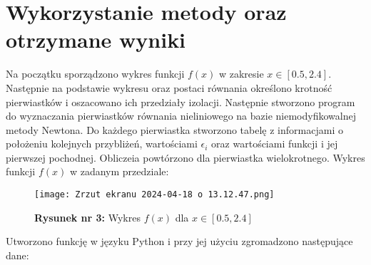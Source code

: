 \documentclass{article}
\begin{document}
\section{Wykorzystanie metody oraz otrzymane wyniki}
Na początku sporządzono wykres funkcji $f(x)$ w zakresie $x \in [0.5, 2.4]$. Następnie na podstawie wykresu oraz postaci równania określono krotność pierwiastków i oszacowano ich przedziały izolacji. Następnie stworzono program do wyznaczania pierwiastków równania nieliniowego na bazie niemodyfikowalnej metody Newtona. Do każdego pierwiastka stworzono tabelę z informacjami o położeniu kolejnych przybliżeń, wartościami $\epsilon_i$ oraz wartościami funkcji i jej pierwszej pochodnej. Obliczeia powtórzono dla pierwiastka wielokrotnego.
\newpage
\noindent
Wykres funkcji $f(x)$ w zadanym przedziale: 
\begin{figure}[H]
    \centering
    \texttt{[image: Zrzut ekranu 2024-04-18 o 13.12.47.png]}
    \caption{\textbf{Rysunek nr 3:} Wykres $f(x)$ dla $x \in [0.5, 2.4]$}
    \label{fig:enter-label}
\end{figure}
\noindent
Utworzono funkcję w języku Python i przy jej użyciu zgromadzono następujące dane:
\end{document}
